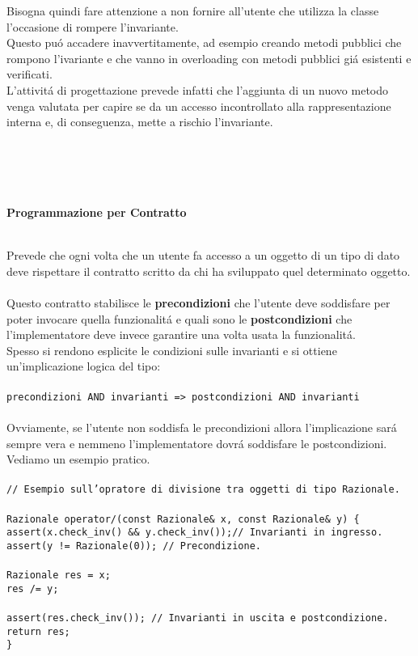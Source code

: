 \documentclass{article}
\newcommand\tab[1][1cm]{\hspace*{#1}}
\begin{document}
Bisogna quindi fare attenzione a non fornire all'utente che utilizza la classe l'occasione di rompere l'invariante.
\\Questo pu\'o accadere inavvertitamente, ad esempio creando metodi pubblici che rompono l'ivariante e che vanno in overloading con metodi pubblici gi\'a esistenti e verificati. \\L'attivit\'a di progettazione prevede infatti che l'aggiunta di un nuovo metodo venga valutata per capire se da un accesso incontrollato alla rappresentazione interna e, di conseguenza, mette a rischio l'invariante.
\\ \\ \\ \\ \\
\begin{large}\textbf{\textcolor{blu}{Programmazione per Contratto}} \\ \\ \end{large}
Prevede che ogni volta che un utente fa accesso a un oggetto di un tipo di dato deve rispettare il contratto scritto da chi ha sviluppato quel determinato oggetto.\\
\\ Questo contratto stabilisce le \textbf{precondizioni} che l'utente deve soddisfare per poter invocare quella funzionalit\'a e quali sono le \textbf{postcondizioni} che l'implementatore deve invece garantire una volta usata la funzionalit\'a. \\ Spesso si rendono esplicite le condizioni sulle invarianti e si ottiene un'implicazione logica del tipo: \\ \\ \texttt{precondizioni AND invarianti => postcondizioni AND invarianti} \\ \\
Ovviamente, se l'utente non soddisfa le precondizioni allora l'implicazione sar\'a sempre vera e nemmeno l'implementatore dovr\'a soddisfare le postcondizioni.\\Vediamo un esempio pratico.\\ \\
\texttt{\textcolor{grigio}{// Esempio sull'opratore di divisione tra oggetti di tipo Razionale.} \\ \\Razionale operator/(const Razionale\& x, const Razionale\& y) \{ \\ \tab assert(x.check\_inv() \&\& y.check\_inv());\textcolor{grigio}{// Invarianti in ingresso.} \\ \tab assert(y != Razionale(0)); \textcolor{grigio}{// Precondizione.}\\ \\ \tab Razionale res = x; \\ \tab res /= y;\\ \\ \tab assert(res.check\_inv()); \textcolor{grigio}{// Invarianti in uscita e postcondizione.} \\ \tab return res; \\ \} }
\end{document}
